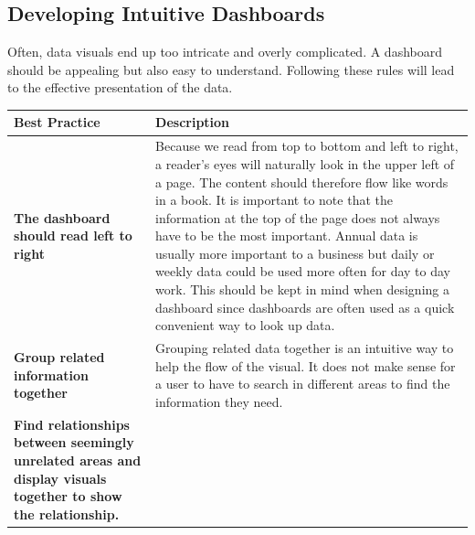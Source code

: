 \documentclass[]{book}
\begin{document}
\hypertarget{developing-intuitive-dashboards}{%
\subsection{Developing Intuitive Dashboards}\label{developing-intuitive-dashboards}}

Often, data visuals end up too intricate and overly complicated. A dashboard should be appealing but also easy to understand. Following these rules will lead to the effective presentation of the data.

\begin{longtable}[]{@{}ll@{}}
\toprule
\begin{minipage}[b]{0.17\columnwidth}\raggedright
Best Practice\strut
\end{minipage} & \begin{minipage}[b]{0.77\columnwidth}\raggedright
Description\strut
\end{minipage}\tabularnewline
\midrule
\endhead
\begin{minipage}[t]{0.17\columnwidth}\raggedright
\textbf{The dashboard should read left to right}\strut
\end{minipage} & \begin{minipage}[t]{0.77\columnwidth}\raggedright
Because we read from top to bottom and left to right, a reader's eyes will naturally look in the upper left of a page. The content should therefore flow like words in a book. It is important to note that the information at the top of the page does not always have to be the most important. Annual data is usually more important to a business but daily or weekly data could be used more often for day to day work. This should be kept in mind when designing a dashboard since dashboards are often used as a quick convenient way to look up data.\strut
\end{minipage}\tabularnewline
\begin{minipage}[t]{0.17\columnwidth}\raggedright
\textbf{Group related information together}\strut
\end{minipage} & \begin{minipage}[t]{0.77\columnwidth}\raggedright
Grouping related data together is an intuitive way to help the flow of the visual. It does not make sense for a user to have to search in different areas to find the information they need.\strut
\end{minipage}\tabularnewline
\begin{minipage}[t]{0.17\columnwidth}\raggedright
\textbf{Find relationships between seemingly unrelated areas and display visuals together to show the relationship.}\strut

\end{minipage}
\end{longtable}
\end{document}
